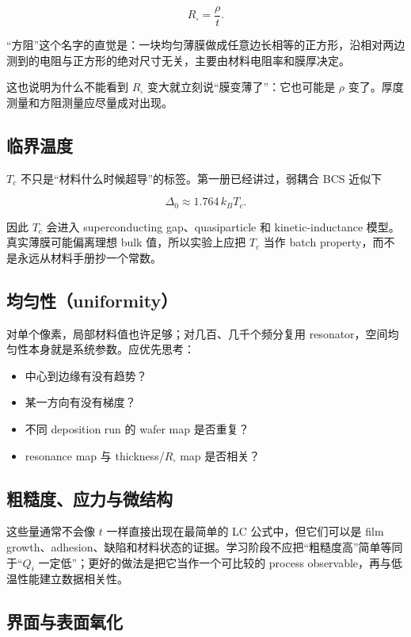 \[
R_\square = \frac{\rho}{t}.
\]

“方阻”这个名字的直觉是：一块均匀薄膜做成任意边长相等的正方形，沿相对两边测到的电阻与正方形的绝对尺寸无关，主要由材料电阻率和膜厚决定。

这也说明为什么不能看到 $R_\square$ 变大就立刻说“膜变薄了”：它也可能是 $\rho$ 变了。厚度测量和方阻测量应尽量成对出现。

\subsection{临界温度}

$T_c$ 不只是“材料什么时候超导”的标签。第一册已经讲过，弱耦合 BCS 近似下

\[
\Delta_0 \approx 1.764\,k_B T_c.
\]

因此 $T_c$ 会进入 superconducting gap、quasiparticle 和 kinetic-inductance 模型。真实薄膜可能偏离理想 bulk 值，所以实验上应把 $T_c$ 当作 batch property，而不是永远从材料手册抄一个常数。

\subsection{均匀性（uniformity）}

对单个像素，局部材料值也许足够；对几百、几千个频分复用 resonator，空间均匀性本身就是系统参数。应优先思考：

\begin{itemize}
  \item 中心到边缘有没有趋势？
  \item 某一方向有没有梯度？
  \item 不同 deposition run 的 wafer map 是否重复？
  \item resonance map 与 thickness/$R_\square$ map 是否相关？
\end{itemize}

\subsection{粗糙度、应力与微结构}

这些量通常不会像 $t$ 一样直接出现在最简单的 LC 公式中，但它们可以是 film growth、adhesion、缺陷和材料状态的证据。学习阶段不应把“粗糙度高”简单等同于“$Q_i$ 一定低”；更好的做法是把它当作一个可比较的 process observable，再与低温性能建立数据相关性。

\subsection{界面与表面氧化}

